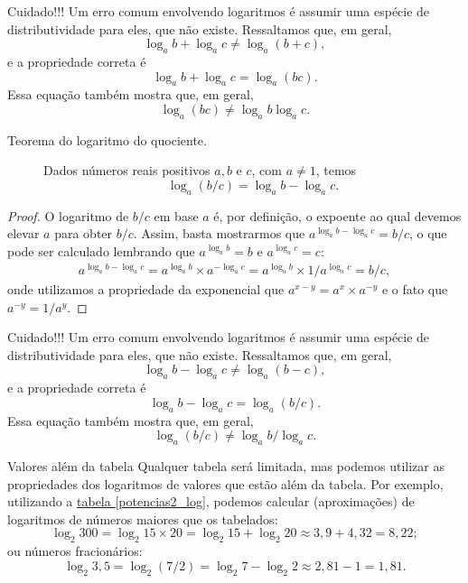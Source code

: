 \begin{observationtitle}{Cuidado!!!}
Um erro comum envolvendo logaritmos é assumir uma espécie de distributividade para eles, que não existe. Ressaltamos que, em geral,
$$
\log_a b + \log_a c \neq \log_a (b +c),
$$
e a propriedade correta é 
$$
\log_a b + \log_a c = \log_a (bc).
$$
Essa equação também mostra que, em geral,
$$
\log_a (bc) \neq \log_a b \log_a c.
$$
\end{observationtitle}


\begin{description}
\item[Teorema do logaritmo do quociente.]\label{teo_log_div} 
Dados números reais positivos $a,b$ e $c$, com $a \neq 1$, temos
$$
\log_a(b/c) = \log_a b - \log_a c.
$$
\end{description}
\begin{proof}
O logaritmo de $b/c$ em base $a$ é, por definição, o expoente ao qual devemos elevar $a$ para obter $b/c$. Assim, basta mostrarmos que $a^{\log_a b - \log_a c} =b/c$, o que pode ser calculado lembrando que $a^{\log_a b}=b$ e $a^{\log_a c}=c$:
\begin{align*}
a^{\log_a b - \log_a c} = a^{\log_a b} \times a^{-\log_a c} = a^{\log_a b} \times 1/ a^{\log_a c}  =b/c,
\end{align*}
onde utilizamos a propriedade da exponencial que $a^{x-y} = a^{x} \times a^{-y}$ e o fato que $a^{-y}=1/a^y$.
\end{proof}


\begin{observationtitle}{Cuidado!!!}
Um erro comum envolvendo logaritmos é assumir uma espécie de distributividade para eles, que não existe. Ressaltamos que, em geral,
$$
\log_a b - \log_a c \neq \log_a (b - c),
$$
e a propriedade correta é 
$$
\log_a b - \log_a c = \log_a (b/c).
$$
Essa equação também mostra que, em geral,
$$
\log_a (b/c) \neq \log_a b/\log_a c.
$$
\end{observationtitle}


\begin{example}{Valores além da tabela}
Qualquer tabela será limitada, mas podemos utilizar as propriedades dos logaritmos de valores que estão além da tabela. Por exemplo, utilizando a \hyperref[potencias2_log]{tabela \ref{potencias2_log}}, podemos calcular (aproximações) de logaritmos de números maiores que os tabelados:
$$
\log_2 300 = \log_2 15 \times 20 = \log_2 15 +\log_2 20 \approx 3{,}9 + 4{,}32 = 8{,}22;
$$
ou números fracionários:
$$
\log_2 3{,}5 = \log_2 (7/2) = \log_2 7 -\log_2 2 \approx 2{,}81 -1 = 1{,}81.
$$
\end{example}

